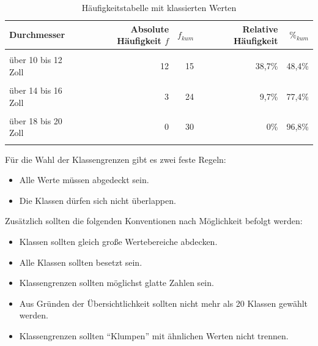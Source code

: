 \documentclass[
  11pt,
  ngerman,
  a4paper,
]{report}
\providecommand{\tightlist}{%
  \setlength{\itemsep}{0pt}\setlength{\parskip}{0pt}}
\begin{document}
\begin{table}

\caption{\label{tab:haeufklass}Häufigkeitstabelle mit klassierten Werten}
\centering
\begin{tabular}[t]{lrrrr}
\toprule
\textbf{Durchmesser} & \textbf{Absolute Häufigkeit $f$} & \textbf{$f_{kum}$} & \textbf{Relative Häufigkeit} & \textbf{$\%_{kum}$}\\
\midrule
\cellcolor{gray!6}{über 8 bis 10 Zoll} & \cellcolor{gray!6}{3} & \cellcolor{gray!6}{3} & \cellcolor{gray!6}{9,7\%} & \cellcolor{gray!6}{9,7\%}\\
über 10 bis 12 Zoll & 12 & 15 & 38,7\% & 48,4\%\\
\cellcolor{gray!6}{über 12 bis 14 Zoll} & \cellcolor{gray!6}{6} & \cellcolor{gray!6}{21} & \cellcolor{gray!6}{19,4\%} & \cellcolor{gray!6}{67,7\%}\\
über 14 bis 16 Zoll & 3 & 24 & 9,7\% & 77,4\%\\
\cellcolor{gray!6}{über 16 bis 18 Zoll} & \cellcolor{gray!6}{6} & \cellcolor{gray!6}{30} & \cellcolor{gray!6}{19,4\%} & \cellcolor{gray!6}{96,8\%}\\
über 18 bis 20 Zoll & 0 & 30 & 0\% & 96,8\%\\
\cellcolor{gray!6}{über 20 bis 22 Zoll} & \cellcolor{gray!6}{1} & \cellcolor{gray!6}{31} & \cellcolor{gray!6}{3,2\%} & \cellcolor{gray!6}{100\%}\\
\bottomrule
\end{tabular}
\end{table}

Für die Wahl der Klassengrenzen gibt es zwei feste Regeln:

\begin{itemize}
\tightlist
\item
  Alle Werte müssen abgedeckt sein.
\item
  Die Klassen dürfen sich nicht überlappen.
\end{itemize}

Zusätzlich sollten die folgenden Konventionen nach Möglichkeit befolgt werden:

\begin{itemize}
\tightlist
\item
  Klassen sollten gleich große Wertebereiche abdecken.
\item
  Alle Klassen sollten besetzt sein.
\item
  Klassengrenzen sollten möglichst glatte Zahlen sein.
\item
  Aus Gründen der Übersichtlichkeit sollten nicht mehr als 20 Klassen gewählt werden.
\item
  Klassengrenzen sollten \enquote{Klumpen} mit ähnlichen Werten nicht trennen.
\end{itemize}
\end{document}
